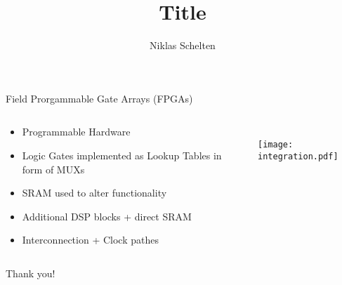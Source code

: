 \documentclass[aspectratio=169,mathserif, ttserif, Nike, c]{tuberlinbeamer}
\title{Title}
\author{Niklas Schelten}
\begin{document}
\maketitle
\begin{frame}[c]{Field Prorgammable Gate Arrays (FPGAs)}
    \begin{columns}
        \begin{column}{.6\textwidth}
            \begin{itemize}
                \setlength\itemsep{1em}
                \item Programmable Hardware
                \item Logic Gates implemented as Lookup Tables in form of MUXs
                \item SRAM used to alter functionality
                \item Additional DSP blocks + direct SRAM
                \item Interconnection + Clock pathes
            \end{itemize}
        \end{column}

        \begin{column}{.4\textwidth}
            \\
            \texttt{[image: integration.pdf]}
        \end{column}
    \end{columns}
\end{frame}


\begin{frame}[c]{Thank you!}
\end{frame}
\end{document}
